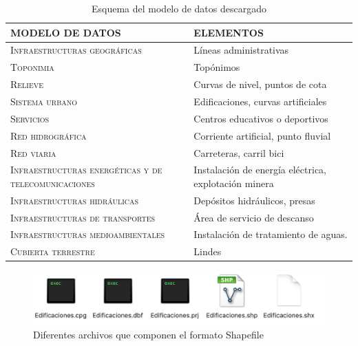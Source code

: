 \begin{enumerate}
	
	\begin{table}[H]
		\caption{Esquema del modelo de datos descargado}
		\label{elementos-mapas}
		\centering
		\begin{tabular}{|m{6.2cm}|m{5.4cm}|}
			\hline
			\rowcolor[HTML]{EFEFEF} 
			\textbf{MODELO DE DATOS} & \textbf{ELEMENTOS} \\ \hline
			\textsc{Infraestructuras geográficas}&  Líneas administrativas            \\ \hline
			\textsc{Toponimia}&              Topónimos      \\ \hline
			\textsc{Relieve}&         Curvas de nivel, puntos de cota           \\ \hline
			\textsc{Sistema urbano}&       Edificaciones, curvas artificiales             \\ \hline
			\textsc{Servicios}&       Centros educativos o deportivos             \\ \hline
			\textsc{Red hidrográfica}&       Corriente artificial, punto fluvial  \\ \hline
			\textsc{Red viaria}&      Carreteras, carril bici              \\ \hline
			\textsc{Infraestructuras energéticas y de telecomunicaciones}&     Instalación de energía eléctrica, explotación minera               \\ \hline
			\textsc{Infraestructuras hidráulicas}&     Depósitos hidráulicos, presas               \\ \hline
			\textsc{Infraestructuras de transportes} &         Área de servicio de descanso       \\ \hline
			\textsc{Infraestructuras medioambientales} &     Instalación de tratamiento de aguas.               \\ \hline
			\textsc{Cubierta terrestre}&           Lindes        \\ \hline
		\end{tabular}
	\end{table}
	
				\begin{figure}[H]
		\centering
		\includegraphics[width=0.87\linewidth]{imagenes/capitulo2/shapefile}
		\caption{Diferentes archivos que componen el formato Shapefile }
		\label{fig:shapefile}
	\end{figure}


\end{enumerate}
